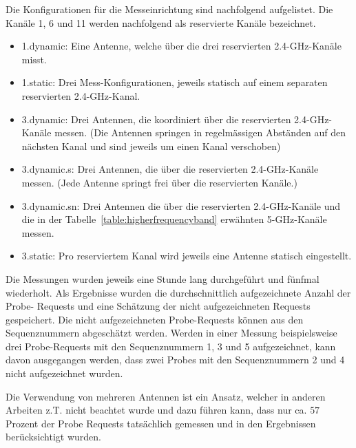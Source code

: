 Die Konfigurationen für die Messeinrichtung sind nachfolgend aufgelistet.
Die Kanäle 1, 6 und 11 werden nachfolgend als reservierte Kanäle bezeichnet.
\begin{itemize}
    \item 1.dynamic: Eine Antenne, welche über die drei reservierten 2.4-GHz-Kanäle misst.
    \item 1.static: Drei Mess-Konfigurationen, jeweils statisch auf einem separaten reservierten 
    2.4-GHz-Kanal.
    \item 3.dynamic: Drei Antennen, die koordiniert über die reservierten 2.4-GHz-Kanäle 
    messen. (Die Antennen springen in regelmässigen Abständen auf den nächsten Kanal und 
    sind jeweils um einen Kanal verschoben)
    \item 3.dynamic.s: Drei Antennen, die über die reservierten 2.4-GHz-Kanäle messen.
    (Jede Antenne springt frei über die reservierten Kanäle.)
    \item 3.dynamic.sn: Drei Antennen die über die reservierten 2.4-GHz-Kanäle und die 
    in der Tabelle~\ref{table:higherfrequencyband} erwähnten 5-GHz-Kanäle messen.
    \item 3.static: Pro reserviertem Kanal wird jeweils eine Antenne statisch eingestellt.
\end{itemize}

Die Messungen wurden jeweils eine Stunde lang durchgeführt und fünfmal 
wiederholt.
Als Ergebnisse wurden die durchschnittlich aufgezeichnete Anzahl der Probe-
Requests und eine Schätzung der nicht aufgezeichneten Requests gespeichert.
Die nicht aufgezeichneten Probe-Requests können aus den Sequenznummern 
abgeschätzt werden. Werden in einer Messung beispielsweise drei Probe-Requests mit den
Sequenznummern 1, 3 und 5 aufgezeichnet, kann davon ausgegangen werden,
dass zwei Probes mit den Sequenznummern 2 und 4 nicht aufgezeichnet wurden.

Die Verwendung von mehreren Antennen ist ein Ansatz, welcher in anderen Arbeiten
z.T. nicht beachtet wurde und dazu führen kann, dass nur ca. $57$ Prozent der Probe
Requests tatsächlich gemessen und in den Ergebnissen berücksichtigt wurden.

\clearpage

